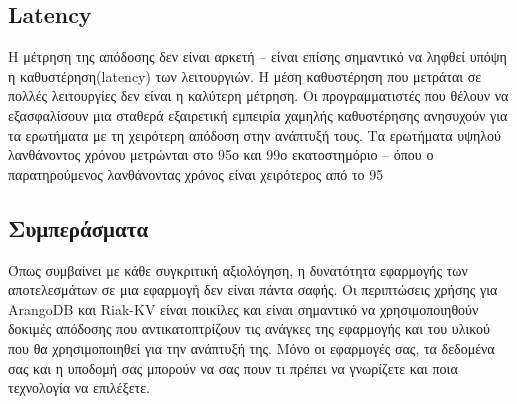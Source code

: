 \documentclass[conference]{IEEEtran}
\begin{document}
\subsection{Latency}
Η μέτρηση της απόδοσης δεν είναι αρκετή – είναι επίσης σημαντικό να ληφθεί υπόψη 
η καθυστέρηση(latency) των λειτουργιών. Η μέση καθυστέρηση που μετράται σε πολλές 
λειτουργίες δεν είναι η καλύτερη μέτρηση. Οι προγραμματιστές που θέλουν να 
εξασφαλίσουν μια σταθερά εξαιρετική εμπειρία χαμηλής καθυστέρησης ανησυχούν 
για τα ερωτήματα με τη χειρότερη απόδοση στην ανάπτυξή τους. Τα ερωτήματα 
υψηλού λανθάνοντος χρόνου μετρώνται στο 95ο και 99ο εκατοστημόριο – όπου ο 
παρατηρούμενος λανθάνοντας χρόνος είναι χειρότερος από το 95%





\subsection{Συμπεράσματα}

Όπως συμβαίνει με κάθε συγκριτική αξιολόγηση, η δυνατότητα εφαρμογής των 
αποτελεσμάτων σε μια εφαρμογή δεν είναι πάντα σαφής. Οι περιπτώσεις χρήσης για 
ArangoDB και Riak-KV είναι ποικίλες και είναι σημαντικό να χρησιμοποιηθούν
δοκιμές απόδοσης που αντικατοπτρίζουν τις ανάγκες της εφαρμογής και του υλικού που θα 
χρησιμοποιηθεί για την ανάπτυξή της.  
Μόνο οι εφαρμογές σας, τα δεδομένα σας και η υποδομή σας μπορούν να σας πουν 
τι πρέπει να γνωρίζετε και ποια τεχνολογία να επιλέξετε. 
\end{document}
